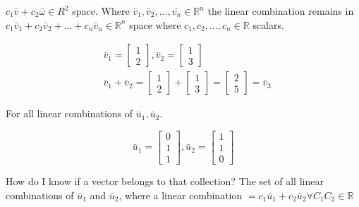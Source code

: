 \documentclass[main.tex]{subfiles}
\begin{document}
    $c_{1} \bar{v}+c_{2} \bar{\omega} \in R^{2}$ space. Where $\bar{v}_{1}, \bar{v}_{2}, \ldots, \bar{v_{n}} \in \mathbb{R}^{n}$ the linear combination remains in $c_{1} \bar{v}_{1}+c_{2} \bar{v}_{2}+\ldots+c_{n} \bar{v}_{n} \in \mathbb{R}^{n}$ space where $c_{1}, c_{2}, \ldots, c_{n} \in \mathbb{R}$ scalars.
    
    $$
    \begin{aligned}
    & \bar{v}_{1} = \left[\begin{array}{l} 1 \\ 2 \end{array}\right],
    \bar{v}_{2} = \left[\begin{array}{l} 1 \\ 3 \end{array}\right] \\
    & \bar{v}_{1} + \bar{v}_{2} = \left[\begin{array}{l} 1 \\ 2 \end{array}\right]
    + \left[\begin{array}{l} 1 \\ 3 \end{array}\right]
    = \left[\begin{array}{l} 2 \\ 5 \end{array}\right] = \bar{v}_{3}
    \end{aligned}
    $$
    
    For all linear combinations of $\bar{u}_{1}, \bar{u}_{2}$.
    
    $$\bar{u}_{1} = \left[\begin{array}{l}0 \\ 1 \\ 1\end{array}\right], \bar{u}_{2}=\left[\begin{array}{l}1 \\ 1 \\ 0\end{array}\right]$$
    
    How do I know if a vector belongs to that collection? The set of all linear combinations of $\bar{u}_{1}$ and $\bar{u}_{2}$, where a linear combination $=c_{1} \bar{u}_{1} + c_{2} \bar{u}_{2} \forall C_{1} C_{2} \in \mathbb{R}$
    
\end{document}
